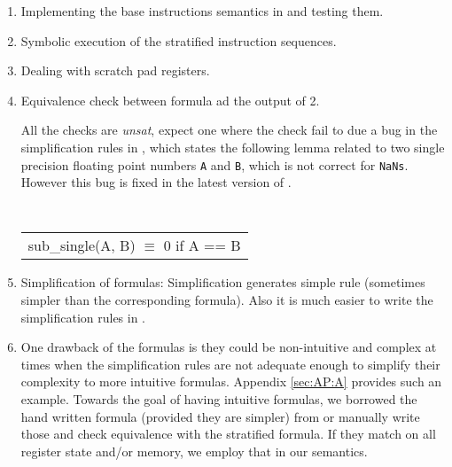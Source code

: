 \begin{enumerate}
\item Implementing the base instructions semantics in \K and testing them.
\item Symbolic execution of the stratified instruction sequences.
\item Dealing with scratch pad registers.
\item Equivalence check between \Strata formula ad the output of 2.
   
   All the checks are \emph{unsat}, expect one where the check fail to due a bug
   in the simplification rules in \Strata, which states the following lemma
   related to two single precision floating point numbers  {\tt A}  and {\tt B},
   which is not correct for {\tt NaNs}. However this bug is fixed in the latest
   version of \Stoke. 
   
   
   { \tt  
        \begin{tabular}[b]{l}
   \qquad sub\_single(A, B) $\equiv$ 0 if A == B     
      \end{tabular}
  }
   
\item {Simplification of formulas:} Simplification generates simple \K rule
(sometimes simpler than the corresponding \Strata formula).  Also it is much
easier to write the simplification rules in \K.


\item One drawback of the \Strata formulas is they could be non-intuitive and
complex at times when the simplification rules are not adequate enough to
simplify their complexity to more intuitive formulas. Appendix \ref{sec:AP:A}
provides such an example.  Towards the goal of having intuitive formulas, we
borrowed the hand written formula (provided they are simpler) from \Stoke or
manually write those  and check equivalence with the stratified formula. If they
match on all register state and/or memory, we employ that in our \K semantics.


       


\end{enumerate}

